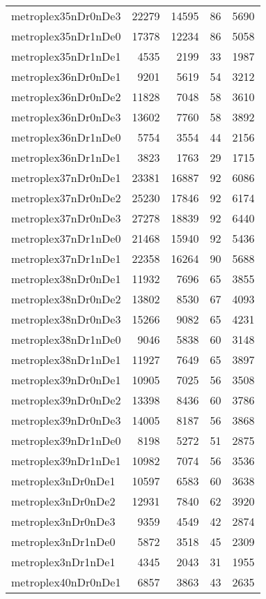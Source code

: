 \begin{longtable}{lrrrr}
metroplex35nDr0nDe3 & 22279 & 14595 & 86 & 5690 \\
metroplex35nDr1nDe0 & 17378 & 12234 & 86 & 5058 \\
metroplex35nDr1nDe1 & 4535 & 2199 & 33 & 1987 \\
metroplex36nDr0nDe1 & 9201 & 5619 & 54 & 3212 \\
metroplex36nDr0nDe2 & 11828 & 7048 & 58 & 3610 \\
metroplex36nDr0nDe3 & 13602 & 7760 & 58 & 3892 \\
metroplex36nDr1nDe0 & 5754 & 3554 & 44 & 2156 \\
metroplex36nDr1nDe1 & 3823 & 1763 & 29 & 1715 \\
metroplex37nDr0nDe1 & 23381 & 16887 & 92 & 6086 \\
metroplex37nDr0nDe2 & 25230 & 17846 & 92 & 6174 \\
metroplex37nDr0nDe3 & 27278 & 18839 & 92 & 6440 \\
metroplex37nDr1nDe0 & 21468 & 15940 & 92 & 5436 \\
metroplex37nDr1nDe1 & 22358 & 16264 & 90 & 5688 \\
metroplex38nDr0nDe1 & 11932 & 7696 & 65 & 3855 \\
metroplex38nDr0nDe2 & 13802 & 8530 & 67 & 4093 \\
metroplex38nDr0nDe3 & 15266 & 9082 & 65 & 4231 \\
metroplex38nDr1nDe0 & 9046 & 5838 & 60 & 3148 \\
metroplex38nDr1nDe1 & 11927 & 7649 & 65 & 3897 \\
metroplex39nDr0nDe1 & 10905 & 7025 & 56 & 3508 \\
metroplex39nDr0nDe2 & 13398 & 8436 & 60 & 3786 \\
metroplex39nDr0nDe3 & 14005 & 8187 & 56 & 3868 \\
metroplex39nDr1nDe0 & 8198 & 5272 & 51 & 2875 \\
metroplex39nDr1nDe1 & 10982 & 7074 & 56 & 3536 \\
metroplex3nDr0nDe1 & 10597 & 6583 & 60 & 3638 \\
metroplex3nDr0nDe2 & 12931 & 7840 & 62 & 3920 \\
metroplex3nDr0nDe3 & 9359 & 4549 & 42 & 2874 \\
metroplex3nDr1nDe0 & 5872 & 3518 & 45 & 2309 \\
metroplex3nDr1nDe1 & 4345 & 2043 & 31 & 1955 \\
metroplex40nDr0nDe1 & 6857 & 3863 & 43 & 2635 \\

\end{longtable}
